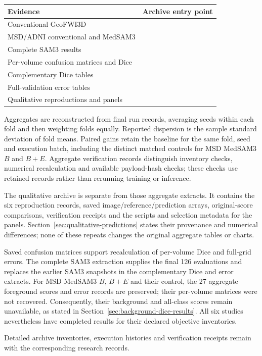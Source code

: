 \documentclass[12pt,a4paper]{article}
\begin{document}
\begin{center}
\small{}
\renewcommand{\arraystretch}{1.2}
\begin{tabular}{@{}P{3.8cm}P{11.2cm}@{}}
\hline
Evidence & Archive entry point \\
\hline
Conventional GeoFWI3D &  \\
MSD/ADNI conventional and MedSAM3 &  \\
Complete SAM3 results &  \\
Per-volume confusion matrices and Dice &  \\
Complementary Dice tables &  \\
Full-validation error tables &  \\
Qualitative reproductions and panels &  \\
\hline
\end{tabular}
\end{center}

Aggregates are reconstructed from final run records, averaging seeds
within each fold and then weighting folds equally. Reported dispersion
is the sample standard deviation of fold means. Paired gains retain the
baseline for the same fold, seed and execution batch, including the
distinct matched controls for MSD MedSAM3 $B$ and $B+E$. Aggregate verification
records distinguish inventory checks, numerical recalculation and
available payload-hash checks; these checks use retained records rather
than rerunning training or inference.

The qualitative archive is separate from those aggregate extracts. It
contains the six reproduction records, saved image/reference/prediction
arrays, original-score comparisons, verification receipts and the scripts
and selection metadata for the panels. Section~\ref{sec:qualitative-predictions}
states their provenance and numerical differences; none of these repeats
changes the original aggregate tables or charts.

Saved confusion matrices support recalculation of per-volume Dice and
full-grid errors. The complete SAM3 extraction supplies the final 126
evaluations and replaces the earlier SAM3 snapshots in the complementary
Dice and error extracts. For MSD MedSAM3 $B$, $B+E$ and their control,
the 27 aggregate foreground scores and error records are preserved;
their per-volume matrices were not recovered. Consequently, their
background and all-class scores remain unavailable, as stated in
Section~\ref{sec:background-dice-results}. All six studies nevertheless
have completed results for their declared objective inventories.

Detailed archive inventories, execution histories and verification
receipts remain with the corresponding research records.

\clearpage
\end{document}
